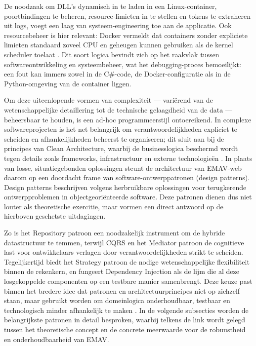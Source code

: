De noodzaak om DLL's dynamisch in te laden in een Linux-container, poortbindingen te beheren, resource-limieten in te stellen en tokens te extraheren uit logs, voegt een laag van systeem-engineering toe aan de applicatie. Ook resourcebeheer is hier relevant: Docker vermeldt dat containers zonder expliciete limieten standaard zoveel CPU en geheugen kunnen gebruiken als de kernel scheduler toelaat \autocite{dockerResourceConstraints}. Dit soort logica bevindt zich op het raakvlak tussen softwareontwikkeling en systeembeheer, wat het debugging-proces bemoeilijkt: een fout kan immers zowel in de C\#-code, de Docker-configuratie als in de Python-omgeving van de container liggen.

{\sloppy Om deze uiteenlopende vormen van complexiteit — variërend van de wetenschappelijke detaillering tot de technische gelaagdheid van de data — beheersbaar te houden, is een ad-hoc programmeerstijl ontoereikend. In complexe softwareprojecten is het net belangrijk om verantwoordelijkheden expliciet te scheiden en afhankelijkheden beheerst te organiseren; dit sluit aan bij de principes van Clean Architecture, waarbij de businesslogica beschermd wordt tegen details zoals frameworks, infrastructuur en externe technologieën \autocite{martin2017clean}. In plaats van losse, situatiegebonden oplossingen steunt de architectuur van EMAV-web daarom op een doordacht frame van software-ontwerppatronen (design patterns). Design patterns beschrijven volgens \textcite{gof1994} herbruikbare oplossingen voor terugkerende ontwerpproblemen in objectgeoriënteerde software. Deze patronen dienen dus niet louter als theoretische exercitie, maar vormen een direct antwoord op de hierboven geschetste uitdagingen.\par}

Zo is het Repository patroon een noodzakelijk instrument om de hybride datastructuur te temmen, terwijl CQRS en het Mediator patroon de cognitieve last voor ontwikkelaars verlagen door verantwoordelijkheden strikt te scheiden. Tegelijkertijd biedt het Strategy patroon de nodige wetenschappelijke flexibiliteit binnen de rekenkern, en fungeert Dependency Injection als de lijm die al deze losgekoppelde componenten op een testbare manier samenbrengt. Deze keuze past binnen het bredere idee dat patronen en architectuurprincipes niet op zichzelf staan, maar gebruikt worden om domeinlogica onderhoudbaar, testbaar en technologisch minder afhankelijk te maken \autocite{millett2015patterns,seemann2019di}. In de volgende subsecties worden de belangrijkste patronen in detail besproken, waarbij telkens de link wordt gelegd tussen het theoretische concept en de concrete meerwaarde voor de robuustheid en onderhoudbaarheid van EMAV.

